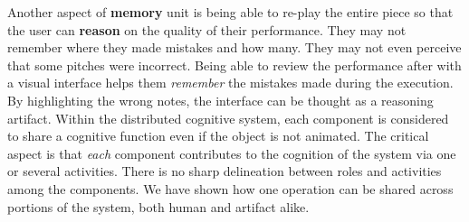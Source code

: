 \documentclass[12pt,letterpaper]{article}
\begin{document}
Another aspect of \textbf{memory} unit is being able to re-play the entire piece so that the user can \textbf{reason} on the quality of their performance. They may not remember where they made mistakes and how many. They may not even perceive that some pitches were incorrect. Being able to review the performance after with a visual interface helps them \textit{remember} the mistakes made during the execution. By highlighting the wrong notes, the interface can be thought as a reasoning artifact. Within the distributed cognitive system, each component is considered to share a cognitive function even if the object is not animated. The critical aspect is that \textit{each} component contributes to the cognition of the system via one or several activities. There is no sharp delineation between roles and activities among the components. We have shown how one operation can be shared across portions of the system, both human and artifact alike. 

 

\end{document}
